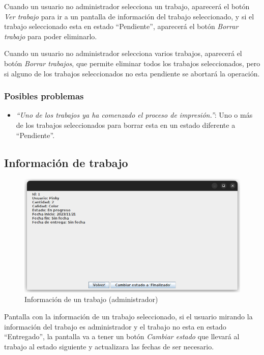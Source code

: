 \documentclass{article}
\begin{document}
Cuando un usuario no administrador selecciona un trabajo, aparecerá el botón \emph{Ver trabajo} para ir a un pantalla de información del trabajo seleccionado, y si el trabajo seleccionado esta en estado ``Pendiente'', aparecerá el botón \emph{Borrar trabajo} para poder eliminarlo.

Cuando un usuario no administrador selecciona varios trabajos, aparecerá el botón \emph{Borrar trabajos}, que permite eliminar todos los trabajos seleccionados, pero si alguno de los trabajos seleccionados no esta pendiente se abortará la operación.

\subsubsection*{Posibles problemas}

\begin{itemize}
    \item \emph{``Uno de los trabajos ya ha comenzado el proceso de impresión.''}: Uno o más de los trabajos seleccionados para borrar esta en un estado diferente a ``Pendiente''.
\end{itemize}

\subsection{Información de trabajo}

\begin{figure}[h]
    \centering
    \includegraphics[width=0.7\linewidth,keepaspectratio]{print-info.png}
    \caption{Información de un trabajo (administrador)}
\end{figure}

Pantalla con la información de un trabajo seleccionado, si el usuario mirando la información del trabajo es administrador y el trabajo no esta en estado ``Entregado'', la pantalla va a tener un botón \emph{Cambiar estado} que llevará al trabajo al estado siguiente y actualizara las fechas de ser necesario.
\end{document}
